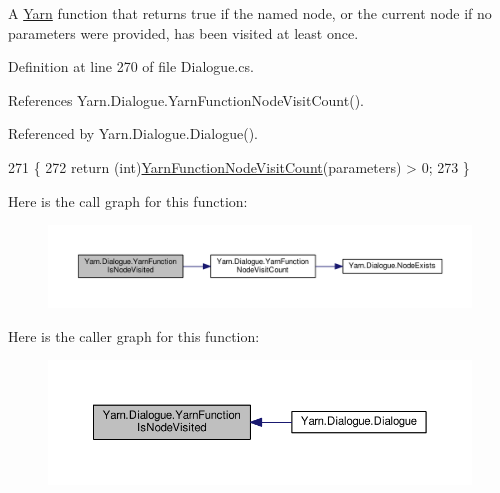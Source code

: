 A \hyperlink{a00050}{Yarn} function that returns true if the named node, or the current node if no parameters were provided, has been visited at least once. 



Definition at line 270 of file Dialogue.\-cs.



References Yarn.\-Dialogue.\-Yarn\-Function\-Node\-Visit\-Count().



Referenced by Yarn.\-Dialogue.\-Dialogue().


\begin{DoxyCode}
271         \{
272             \textcolor{keywordflow}{return} (\textcolor{keywordtype}{int})\hyperlink{a00090_a10c9f22d3f55e74f091cd6069c431094}{YarnFunctionNodeVisitCount}(parameters) > 0;
273         \}
\end{DoxyCode}


Here is the call graph for this function\-:
\nopagebreak
\begin{figure}[H]
\begin{center}
\leavevmode
\includegraphics[width=350pt]{a00090_a1ab129bd84381928531d503304ca08d6_cgraph}
\end{center}
\end{figure}




Here is the caller graph for this function\-:
\nopagebreak
\begin{figure}[H]
\begin{center}
\leavevmode
\includegraphics[width=350pt]{a00090_a1ab129bd84381928531d503304ca08d6_icgraph}
\end{center}
\end{figure}



